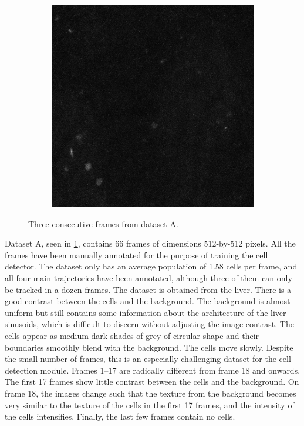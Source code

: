 \begin{figure}[h]
\begin{subfigure}{.32\textwidth}
   		\end{subfigure}
   		\hfill
   		\begin{subfigure}{.32\textwidth}
   		\includegraphics[width=\textwidth]{images/series30green021}
   		\end{subfigure}
   		\caption{Three consecutive frames from dataset A.}
   		\label{fig:data_datasetA}
   	\end{figure}
   	  	
   	Dataset A, seen in \cref{fig:data_datasetA}, contains 66 frames of dimensions 512-by-512 pixels. All the frames have been manually annotated for the purpose of training the cell detector. The dataset only has an average population of 1.58 cells per frame, and all four main trajectories have been annotated, although three of them can only be tracked in a dozen frames. The dataset is obtained from the liver. There is a good contrast between the cells and the background. The background is almost uniform but still contains some information about the architecture of the liver sinusoids, which is difficult to discern without adjusting the image contrast. The cells appear as medium dark shades of grey of circular shape and their boundaries smoothly blend with the background. The cells move slowly. Despite the small number of frames, this is an especially challenging dataset for the cell detection module. Frames 1--17 are radically different from frame 18 and onwards. The first 17 frames show little contrast between the cells and the background. On frame 18, the images change such that the texture from the background becomes very similar to the texture of the cells in the first 17 frames, and the intensity of the cells intensifies. Finally, the last few frames contain no cells.
   	   	
